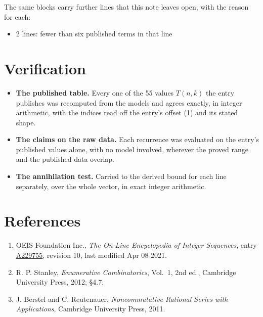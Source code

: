 \documentclass[11pt]{article}
\theoremstyle{definition}
\begin{document}
The same blocks carry further lines that this note leaves open, with the reason for each:

\begin{itemize}

\item 2 lines: fewer than six published terms in that line

\end{itemize}

\section{Verification}

\begin{itemize}

\item {\bfseries The published table.} Every one of the 55 values $T(n,k)$ the entry publishes was recomputed from the models and agrees exactly, in integer arithmetic, with the indices read off the entry's offset (1) and its stated shape.

\item {\bfseries The claims on the raw data.} Each recurrence was evaluated on the entry's published values alone, with no model involved, wherever the proved range and the published data overlap.

\item {\bfseries The annihilation test.} Carried to the derived bound for each line separately, over the whole vector, in exact integer arithmetic.

\end{itemize}

\section{References}

\begin{enumerate}

\item OEIS Foundation Inc., \emph{The On-Line Encyclopedia of Integer Sequences}, entry \href{https://oeis.org/A229755}{A229755}, revision 10, last modified Apr 08 2021.

\item R. P. Stanley, \emph{Enumerative Combinatorics}, Vol.~1, 2nd ed., Cambridge University Press, 2012; \S4.7.

\item J. Berstel and C. Reutenauer, \emph{Noncommutative Rational Series with Applications}, Cambridge University Press, 2011.

\end{enumerate}
\end{document}
